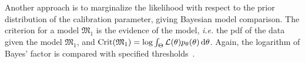\documentclass[../../Main_ManuscritThese.tex]{subfiles}
\begin{document}
Another approach is to marginalize the likelihood with respect to the
prior distribution of the calibration parameter, giving Bayesian model
comparison. The criterion for a model $\mathfrak{M}_1$ is the evidence
of the model, \emph{i.e.} the pdf of the data given the model
$\mathfrak{M}_1$, and
$\mathrm{Crit}(\mathfrak{M}_1) = \log \int_\Theta \mathcal{L}(\theta)
p_\theta(\theta)\,\mathrm{d}\theta$.
Again, the logarithm of Bayes' factor is compared with specified
thresholds~\citep{kass_bayes_1995,burnham_multimodel_2004}.
\end{document}
